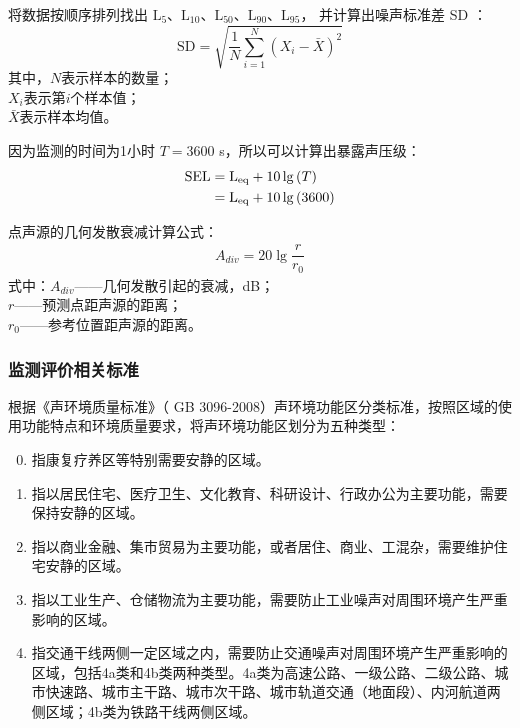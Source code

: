 将数据按顺序排列找出 $\mathrm{L_{5}}$、$\mathrm{L_{10}}$、$\mathrm{L_{50}}$、$\mathrm{L_{90}}$、$\mathrm{L_{95}}$，
并计算出噪声标准差 SD ：
\begin{equation}
    \text{{SD}} = \sqrt{\frac{1}{N}\sum_{i=1}^{N}(X_i - \bar{X})^2}
\end{equation}
其中，$N$表示样本的数量； \\
\phantom{其中，}$X_i$表示第$i$个样本值； \\
\phantom{其中，}$\bar{X}$表示样本均值。

因为监测的时间为1小时 $T=3600$ s，所以可以计算出暴露声压级：
\begin{align}
    \text{SEL} &= \mathrm{L_{eq}} + 10\lg{(T)} \\
    &= \mathrm{L_{eq}} + 10\lg{(3600)} \notag
\end{align}

点声源的几何发散衰减计算公式：
\begin{align} \label{eq:Geometric divergence attenuation calculation of point sound sources}
    A_{div} = 20\lg{\dfrac{r}{r_0}}
\end{align}
式中：$A_{div}$——几何发散引起的衰减，dB；\\
\phantom{式中：}$r$——预测点距声源的距离；\\
\phantom{式中：}$r_0$——参考位置距声源的距离。

 

\subsubsection{监测评价相关标准}

根据《声环境质量标准》（ GB 3096-2008）声环境功能区分类标准，按照区域的使用功能特点和环境质量要求，将声环境功能区划分为五种类型：
\begin{enumerate}[label={\arabic*类声环境功能区：},align=left, leftmargin=*]
    \setcounter{enumi}{-1}
    \item 指康复疗养区等特别需要安静的区域。
    \item 指以居民住宅、医疗卫生、文化教育、科研设计、行政办公为主要功能，需要保持安静的区域。
    \item 指以商业金融、集市贸易为主要功能，或者居住、商业、工混杂，需要维护住宅安静的区域。
    \item 指以工业生产、仓储物流为主要功能，需要防止工业噪声对周围环境产生严重影响的区域。
    \item 指交通干线两侧一定区域之内，需要防止交通噪声对周围环境产生严重影响的区域，包括4a类和4b类两种类型。4a类为高速公路、一级公路、二级公路、城市快速路、城市主干路、城市次干路、城市轨道交通（地面段）、内河航道两侧区域；4b类为铁路干线两侧区域。
\end{enumerate}

